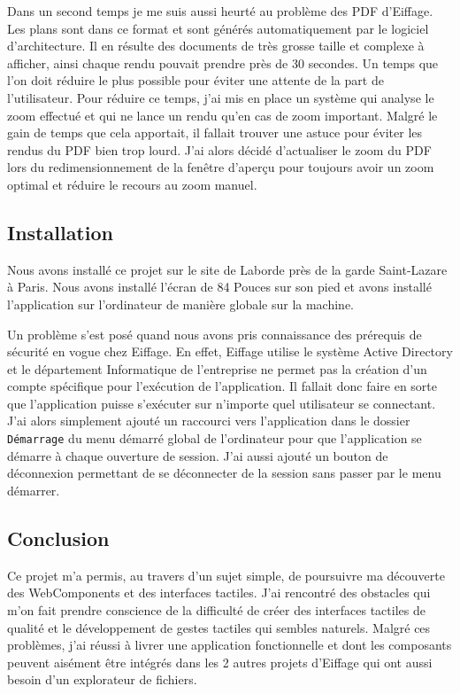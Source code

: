Dans un second temps je me suis aussi heurté au problème des PDF d'Eiffage.
Les plans sont dans ce format et sont générés automatiquement par le logiciel d'architecture.
Il en résulte des documents de très grosse taille et complexe à afficher, ainsi chaque rendu pouvait prendre près de 30 secondes.
Un temps que l'on doit réduire le plus possible pour éviter une attente de la part de l'utilisateur.
Pour réduire ce temps, j'ai mis en place un système qui analyse le zoom effectué et qui ne lance un rendu qu'en cas de zoom important.
Malgré le gain de temps que cela apportait, il fallait trouver une astuce pour éviter les rendus du PDF bien trop lourd.
J'ai alors décidé d'actualiser le zoom du PDF lors du redimensionnement de la fenêtre d'aperçu pour toujours avoir un zoom optimal et réduire le recours au zoom manuel.

\subsection{Installation}

Nous avons installé ce projet sur le site de Laborde près de la garde Saint-Lazare à Paris.
Nous avons installé l'écran de 84 Pouces sur son pied et avons installé l'application sur l'ordinateur de manière globale sur la machine.

Un problème s'est posé quand nous avons pris connaissance des prérequis de sécurité en vogue chez Eiffage.
En effet, Eiffage utilise le système Active Directory et le département Informatique de l'entreprise ne permet pas la création d'un compte spécifique pour l'exécution de l'application.
Il fallait donc faire en sorte que l'application puisse s'exécuter sur n'importe quel utilisateur se connectant.
J'ai alors simplement ajouté un raccourci vers l'application dans le dossier \texttt{Démarrage} du menu démarré global de l'ordinateur pour que l'application se démarre à chaque ouverture de session.
J'ai aussi ajouté un bouton de déconnexion permettant de se déconnecter de la session sans passer par le menu démarrer.

\subsection{Conclusion}

Ce projet m'a permis, au travers d'un sujet simple, de poursuivre ma découverte des WebComponents et des interfaces tactiles.
J'ai rencontré des obstacles qui m'on fait prendre conscience de la difficulté de créer des interfaces tactiles de qualité et le développement de gestes tactiles qui sembles naturels.
Malgré ces problèmes, j'ai réussi à livrer une application fonctionnelle et dont les composants peuvent aisément être intégrés dans les 2 autres projets d'Eiffage qui ont aussi besoin d'un explorateur de fichiers.
